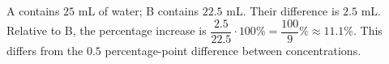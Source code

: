 A contains $25$ mL of water; B contains $22.5$ mL. Their difference is $2.5$ mL. Relative to B, the percentage increase is $\dfrac{2.5}{22.5}\cdot100\%=\boxed{\dfrac{100}{9}\%}\approx11.1\%$. This differs from the $0.5$ percentage-point difference between concentrations.
